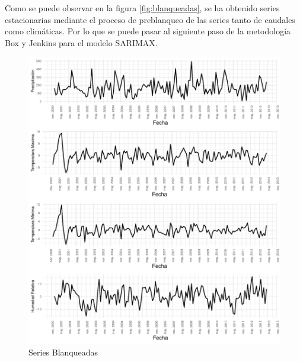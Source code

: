 \documentclass[12pt,oneside]{book}\usepackage[]{graphicx}\usepackage[]{color}
\makeatletter
\def\maxwidth{ %
  \ifdim\Gin@nat@width>\linewidth
    \linewidth
  \else
    \Gin@nat@width
  \fi
}
\newenvironment{knitrout}{}{} %
\theoremstyle{definition} %
\makeatother
\begin{document}
Como se puede observar en la figura \ref{fig:blanqueadas}, se ha obtenido series estacionarias mediante el proceso de preblanqueo de las series tanto de caudales como climáticas. Por lo que se puede pasar al siguiente paso de la metodología Box y Jenkins para el modelo SARIMAX.




\begin{knitrout}
\color{fgcolor}\begin{figure}[H]

{\centering \includegraphics[width=\maxwidth]{figure/unnamed-chunk-32-1} 

}

\caption{\label{fig:blanqueadas} Series Blanqueadas}\label{fig:unnamed-chunk-32}
\end{figure}


\end{knitrout}
\end{document}
